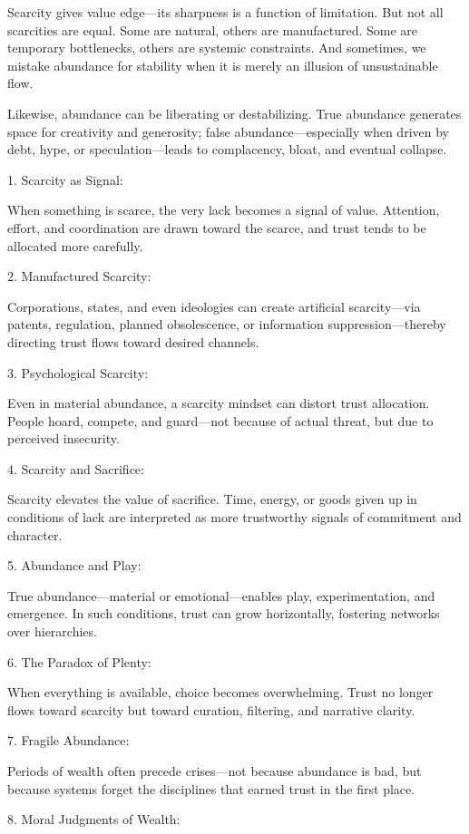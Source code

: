 \documentclass[11pt,oneside]{book}
\begin{document}
Scarcity gives value edge—its sharpness is a function of limitation. But not all scarcities are equal. Some are natural, others are manufactured. Some are temporary bottlenecks, others are systemic constraints. And sometimes, we mistake abundance for stability when it is merely an illusion of unsustainable flow.

Likewise, abundance can be liberating or destabilizing. True abundance generates space for creativity and generosity; false abundance—especially when driven by debt, hype, or speculation—leads to complacency, bloat, and eventual collapse. 


1. Scarcity as Signal:

When something is scarce, the very lack becomes a signal of value. Attention, effort, and coordination are drawn toward the scarce, and trust tends to be allocated more carefully.


2. Manufactured Scarcity:

Corporations, states, and even ideologies can create artificial scarcity—via patents, regulation, planned obsolescence, or information suppression—thereby directing trust flows toward desired channels.


3. Psychological Scarcity:

Even in material abundance, a scarcity mindset can distort trust allocation. People hoard, compete, and guard—not because of actual threat, but due to perceived insecurity.


4. Scarcity and Sacrifice:

Scarcity elevates the value of sacrifice. Time, energy, or goods given up in conditions of lack are interpreted as more trustworthy signals of commitment and character.


5. Abundance and Play:

True abundance—material or emotional—enables play, experimentation, and emergence. In such conditions, trust can grow horizontally, fostering networks over hierarchies.


6. The Paradox of Plenty:

When everything is available, choice becomes overwhelming. Trust no longer flows toward scarcity but toward curation, filtering, and narrative clarity.


7. Fragile Abundance:

Periods of wealth often precede crises—not because abundance is bad, but because systems forget the disciplines that earned trust in the first place.


8. Moral Judgments of Wealth:
\end{document}
